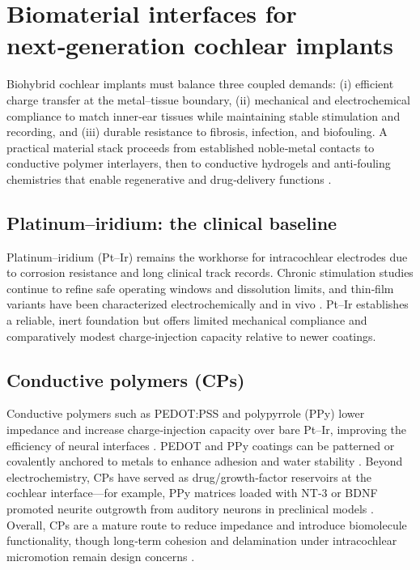\section{Biomaterial interfaces for next‑generation cochlear implants}
\label{sec:biomaterials}

Biohybrid cochlear implants must balance three coupled demands: (i) efficient charge transfer at the metal–tissue boundary, (ii) mechanical and electrochemical compliance to match inner‑ear tissues while maintaining stable stimulation and recording, and (iii) durable resistance to fibrosis, infection, and biofouling. A practical material stack proceeds from established noble‑metal contacts to conductive polymer interlayers, then to conductive hydrogels and anti‑fouling chemistries that enable regenerative and drug‑delivery functions \cite{CarnicerLombarte2024AdvMat}.

\subsection{Platinum–iridium: the clinical baseline}
Platinum–iridium (Pt–Ir) remains the workhorse for intracochlear electrodes due to corrosion resistance and long clinical track records. Chronic stimulation studies continue to refine safe operating windows and dissolution limits, and thin‑film variants have been characterized electrochemically and in vivo \cite{Shepherd2020,Dalrymple2020_ptir}. Pt–Ir establishes a reliable, inert foundation but offers limited mechanical compliance and comparatively modest charge‑injection capacity relative to newer coatings.

\subsection{Conductive polymers (CPs)}
Conductive polymers such as PEDOT:PSS and polypyrrole (PPy) lower impedance and increase charge‑injection capacity over bare Pt–Ir, improving the efficiency of neural interfaces \cite{Venkatraman2011-ql,li2025pedot}. PEDOT and PPy coatings can be patterned or covalently anchored to metals to enhance adhesion and water stability \cite{Kleber2017,Chhin2018}. Beyond electrochemistry, CPs have served as drug/growth‑factor reservoirs at the cochlear interface—for example, PPy matrices loaded with NT‑3 or BDNF promoted neurite outgrowth from auditory neurons in preclinical models \cite{Richardson2007,Richardson2009,Evans2009-cm}. Overall, CPs are a mature route to reduce impedance and introduce biomolecule functionality, though long‑term cohesion and delamination under intracochlear micromotion remain design concerns \cite{li2025pedot}.

